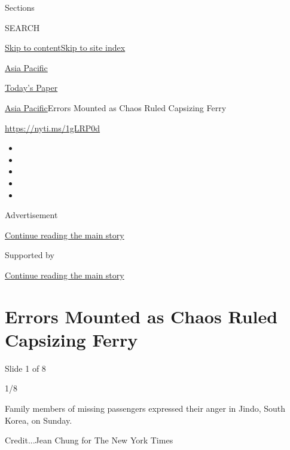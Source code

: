 Sections

SEARCH

\protect\hyperlink{site-content}{Skip to
content}\protect\hyperlink{site-index}{Skip to site index}

\href{https://www.nytimes3xbfgragh.onion/section/world/asia}{Asia
Pacific}

\href{https://myaccount.nytimes3xbfgragh.onion/auth/login?response_type=cookie\&client_id=vi}{}

\href{https://www.nytimes3xbfgragh.onion/section/todayspaper}{Today's
Paper}

\href{/section/world/asia}{Asia Pacific}\textbar{}Errors Mounted as
Chaos Ruled Capsizing Ferry

\url{https://nyti.ms/1gLRP0d}

\begin{itemize}
\item
\item
\item
\item
\item
\end{itemize}

Advertisement

\protect\hyperlink{after-top}{Continue reading the main story}

Supported by

\protect\hyperlink{after-sponsor}{Continue reading the main story}

\hypertarget{errors-mounted-as-chaos-ruled-capsizing-ferry}{%
\section{Errors Mounted as Chaos Ruled Capsizing
Ferry}\label{errors-mounted-as-chaos-ruled-capsizing-ferry}}

Slide 1 of 8

1/8

Family members of missing passengers expressed their anger in Jindo,
South Korea, on Sunday.

Credit...Jean Chung for The New York Times

